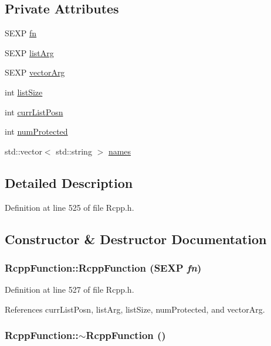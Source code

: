\subsection*{Private Attributes}
\begin{CompactItemize}
\item 
SEXP \hyperlink{classRcppFunction_a6b5966224b8b7d158be6cdfc3612063}{fn}
\item 
SEXP \hyperlink{classRcppFunction_3b8a2c8441c9791f9fe5bd5273bbceec}{listArg}
\item 
SEXP \hyperlink{classRcppFunction_0492c128c0f72cda44e679265b36b50e}{vectorArg}
\item 
int \hyperlink{classRcppFunction_c3a42478ffd123f430ba3e09099db6f8}{listSize}
\item 
int \hyperlink{classRcppFunction_ce513a92e96b36883b709b5352ea5663}{currListPosn}
\item 
int \hyperlink{classRcppFunction_dc777e7d1628ccc4f531a8375f30f385}{numProtected}
\item 
std::vector$<$ std::string $>$ \hyperlink{classRcppFunction_bf9e86df5e1a290a5f321e6051f0d2b2}{names}
\end{CompactItemize}


\subsection{Detailed Description}


Definition at line 525 of file Rcpp.h.

\subsection{Constructor \& Destructor Documentation}
\hypertarget{classRcppFunction_6fc6fca8d052170d86240c784f54261a}{
\subsubsection[{RcppFunction}]{\setlength{\rightskip}{0pt plus 5cm}RcppFunction::RcppFunction (SEXP {\em fn})}}
\label{classRcppFunction_6fc6fca8d052170d86240c784f54261a}




Definition at line 527 of file Rcpp.h.

References currListPosn, listArg, listSize, numProtected, and vectorArg.\hypertarget{classRcppFunction_e155cf5dd33cb110e9a89a59c7bff6e9}{
\subsubsection[{$\sim$RcppFunction}]{\setlength{\rightskip}{0pt plus 5cm}RcppFunction::$\sim$RcppFunction ()}}
\label{classRcppFunction_e155cf5dd33cb110e9a89a59c7bff6e9}




